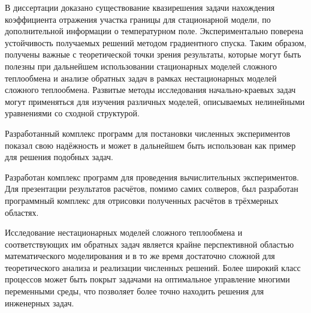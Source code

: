 В диссертации доказано существование квазирешения задачи нахождения
коэффициента отражения участка границы для стационарной модели,
по дополнительной информации о температурном поле.
Экспериментально поверена устойчивость получаемых
решений методом градиентного спуска.
Таким образом, получены важные с теоретической точки зрения результаты,
которые могут быть полезны при дальнейшем использовании
стационарных моделей сложного теплообмена и анализе обратных
задач в рамках нестационарных моделей сложного теплообмена.
Развитые методы исследования начально-краевых задач могут
применяться для изучения различных моделей, описываемых нелинейными
уравнениями со сходной структурой.

Разработанный комплекс программ для постановки численных экспериментов
показал свою надёжность и может в дальнейшем быть использован как
пример для решения подобных задач.

Разработан комплекс программ для проведения вычислительных экспериментов.
Для презентации результатов расчётов, помимо самих солверов,
был разработан программный комплекс для отрисовки
полученных расчётов в трёхмерных областях.

Исследование нестационарных моделей сложного теплообмена и соответствующих им
обратных задач является крайне перспективной областью математического моделирования
и в то же время достаточно сложной для теоретического
анализа и реализации численных решений.
Более широкий класс процессов может быть покрыт задачами на оптимальное
управление многими переменными среды, что позволяет более точно находить
решения для инженерных задач.

